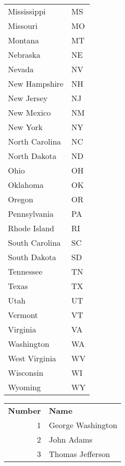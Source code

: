 \begin{longtable}{|l|l|}
  Mississippi& MS\\
  Missouri& MO\\
  Montana& MT\\
  Nebraska& NE\\
  Nevada& NV\\
  New Hampshire& NH\\
  New Jersey& NJ\\
  New Mexico& NM\\
  New York& NY\\
  North Carolina& NC\\
  North Dakota& ND\\
  Ohio& OH\\
  Oklahoma& OK\\
  Oregon& OR\\
  Pennsylvania& PA\\
  Rhode Island& RI\\
  South Carolina& SC\\
  South Dakota& SD\\
  Tennessee& TN\\
  Texas& TX\\
  Utah& UT\\
  Vermont& VT\\
  Virginia& VA\\
  Washington& WA\\
  West Virginia& WV\\
  Wisconsin& WI\\
  Wyoming& WY\\
\end{longtable}

\newcommand{\cbackslash}{\char'134}
\newcommand{\copencurly}{\char'173}
\newcommand{\cclosecurly}{\char'175}

\newlength{\twidth}
\newlength{\theight}

\setlength{\twidth}{\textwidth}
\setlength{\theight}{\textheight}

\begin{sidewaystable}
  \setlength{\textwidth}{\theight}
  \setlength{\textheight}{\twidth}
  \caption{%
    sidewaystable
    {\tt\cbackslash begin\copencurly tabular\cclosecurly\/}%
    \ldots
    {\tt\cbackslash end\copencurly tabular\cclosecurly\/}%
  }
  \begin{center}
    \begin{tabular}{rl}
      \bf Number& \bf Name\\[2pt]  %
      1& George Washington\\
      2& John Adams\\
      3& Thomas Jefferson\\
    \end{tabular}
  \end{center}
\end{sidewaystable}

